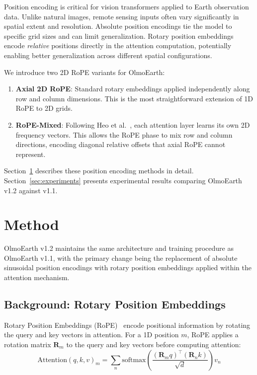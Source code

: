 \documentclass{article}
\begin{document}
Position encoding is critical for vision transformers applied to Earth observation data. Unlike natural images, remote sensing inputs often vary significantly in spatial extent and resolution. Absolute position encodings tie the model to specific grid sizes and can limit generalization. Rotary position embeddings encode \emph{relative} positions directly in the attention computation, potentially enabling better generalization across different spatial configurations.

We introduce two 2D RoPE variants for OlmoEarth:

\begin{enumerate}
    \item \textbf{Axial 2D RoPE}: Standard rotary embeddings applied independently along row and column dimensions. This is the most straightforward extension of 1D RoPE to 2D grids.
    
    \item \textbf{RoPE-Mixed}: Following Heo et al.~\cite{heo2024rope}, each attention layer learns its own 2D frequency vectors. This allows the RoPE phase to mix row and column directions, encoding diagonal relative offsets that axial RoPE cannot represent.
\end{enumerate}

Section~\ref{sec:method} describes these position encoding methods in detail. Section~\ref{sec:experiments} presents experimental results comparing OlmoEarth v1.2 against v1.1.

\section{Method}
\label{sec:method}

OlmoEarth v1.2 maintains the same architecture and training procedure as OlmoEarth v1.1, with the primary change being the replacement of absolute sinusoidal position encodings with rotary position embeddings applied within the attention mechanism.

\subsection{Background: Rotary Position Embeddings}

Rotary Position Embeddings (RoPE)~\cite{su2021roformer} encode positional information by rotating the query and key vectors in attention. For a 1D position $m$, RoPE applies a rotation matrix $\mathbf{R}_m$ to the query and key vectors before computing attention:
\begin{equation}
    \text{Attention}(q, k, v)_m = \sum_n \text{softmax}\left(\frac{(\mathbf{R}_m q)^\top (\mathbf{R}_n k)}{\sqrt{d}}\right) v_n
\end{equation}
\end{document}
